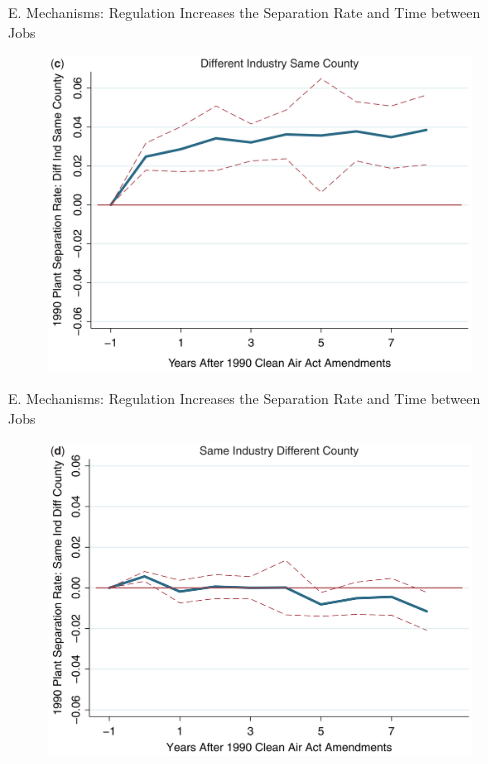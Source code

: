 \documentclass{beamer}
\begin{document}
\begin{frame}{E. Mechanisms: Regulation Increases the Separation Rate and Time between Jobs}
	\begin{figure}[h]
		\centering
		\includegraphics[scale=0.35]{figure6c.png}
	\end{figure}
\end{frame}
\begin{frame}{E. Mechanisms: Regulation Increases the Separation Rate and Time between Jobs}
	\begin{figure}[h]
		\centering
		\includegraphics[scale=0.35]{figure6d.png}
	\end{figure}
\end{frame}
\end{document}
